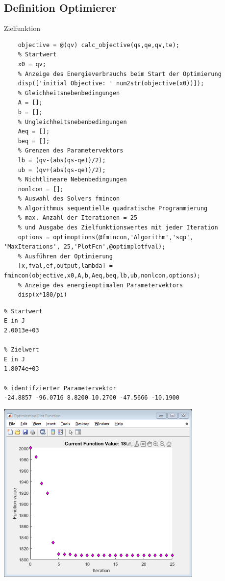 \subsection*{Definition Optimierer}
%
\begin{par}
	Zielfunktion
\end{par} \vspace{1em}
\begin{lstlisting}
	objective = @(qv) calc_objective(qs,qe,qv,te);
	% Startwert
	x0 = qv;
	% Anzeige des Energieverbrauchs beim Start der Optimierung
	disp(['initial Objective: ' num2str(objective(x0))]);
	% Gleichheitsnebenbedingungen
	A = [];
	b = [];
	% Ungleichheitsnebenbedingungen
	Aeq = [];
	beq = [];
	% Grenzen des Parametervektors
	lb = (qv-(abs(qs-qe))/2);
	ub = (qv+(abs(qs-qe))/2);
	% Nichtlineare Nebenbedingungen
	nonlcon = [];
	% Auswahl des Solvers fmincon
	% Algorithmus sequentielle quadratische Programmierung
	% max. Anzahl der Iterationen = 25
	% und Ausgabe des Zielfunktionswertes mit jeder Iteration
	options = optimoptions(@fmincon,'Algorithm','sqp', 'MaxIterations', 25,'PlotFcn',@optimplotfval);
	% Ausführen der Optimierung
	[x,fval,ef,output,lambda] = fmincon(objective,x0,A,b,Aeq,beq,lb,ub,nonlcon,options);
	% Anzeige des energieoptimalen Parametervektors
	disp(x*180/pi)
\end{lstlisting}
\color{lightgray} \begin{lstlisting}
% Startwert
E in J
2.0013e+03

% Zielwert
E in J
1.8074e+03

% identifzierter Parametervektor
-24.8857 -96.0716 8.8200 10.2700 -47.5666 -10.1900

\end{lstlisting} \color{black}
%
\includegraphics [width=4in]{images/optimization_01}
%
